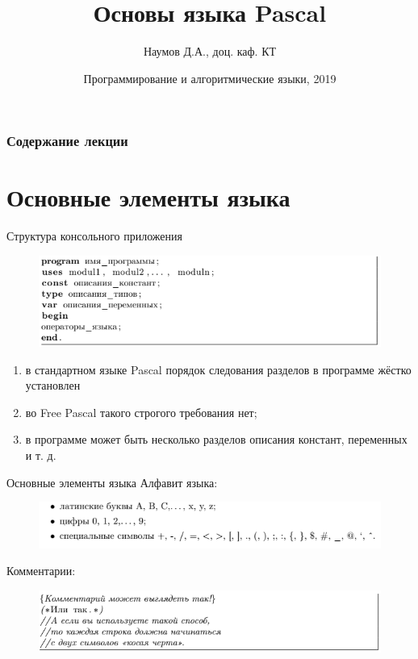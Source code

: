 \documentclass{beamer}
\title[Основы языка Pascal]{Основы языка Pascal}
\author{Наумов Д.А., доц. каф. КТ}
\date[19.09.2019] {Программирование и алгоритмические языки, 2019}
\begin{document}
\begin{frame}
  \titlepage
\end{frame}
  
\begin{frame}
  \frametitle{Содержание лекции}
  \tableofcontents  
\end{frame}

\section{Основные элементы языка}

\begin{frame}{Структура консольного приложения}
\begin{figure}[h]
\centering
\includegraphics[scale=0.6]{images/lec02-pic01.png}
\end{figure}
\begin{enumerate}
\item в стандартном языке Pascal порядок следования разделов в программе жёстко установлен
\item во Free Pascal такого строгого требования нет;
\item в программе может быть несколько разделов описания констант, переменных и т. д.
\end{enumerate}
\end{frame} 

\begin{frame}{Основные элементы языка}
Алфавит языка:
\begin{figure}[h]
\centering
\includegraphics[scale=0.75]{images/lec02-pic02.png}
\end{figure}
Комментарии:
\begin{figure}[h]
\centering
\includegraphics[scale=0.75]{images/lec02-pic03.png}
\end{figure}
\end{frame}
\end{document}
